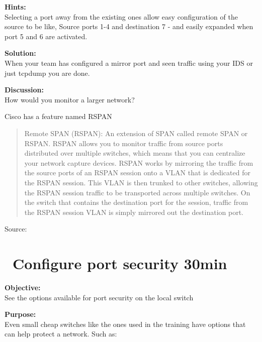 \documentclass[a4paper,11pt,notitlepage]{report}
\begin{document}
{\bf Hints:}\\
Selecting a port away from the existing ones allow easy configuration of the source to be like, Source ports 1-4 and destination 7 - and easily expanded when port 5 and 6 are activated.

{\bf Solution:}\\
When your team has configured a mirror port and seen traffic using your IDS or just tcpdump you are done.

{\bf Discussion:}\\
How would you monitor a larger network?

Cisco has a feature named RSPAN

\begin{quote}
Remote SPAN (RSPAN): An extension of SPAN called remote SPAN or RSPAN. RSPAN allows you to monitor traffic from source ports distributed over multiple switches, which means that you can centralize your network capture devices. RSPAN works by mirroring the traffic from the source ports of an RSPAN session onto a VLAN that is dedicated for the RSPAN session. This VLAN is then trunked to other switches, allowing the RSPAN session traffic to be transported across multiple switches. On the switch that contains the destination port for the session, traffic from the RSPAN session VLAN is simply mirrored out the destination port.
\end{quote}
Source: {\small{}}



\chapter{\faInfoCircle\ Configure port security 30min}
\label{ex:port-security}

{\bf Objective:}\\
See the options available for port security on the local switch

{\bf Purpose:}\\
Even small cheap switches like the ones used in the training have options that can help protect a network. Such as:
\end{document}
